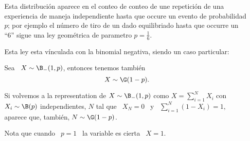 Esta distribuci\'on  aparece en el conteo  de conteo de une  repetici\'on de una
experiencia de maneja  independiente hasta que occure un  evento de probabilidad
$p$; por ejemplo  el n\'umero de tiro de un dado  equilibriado hasta que occurre
un ``6'' sigue una ley geom\'etrica de parametro $p = \frac16$.

Esta ley esta v\'inculada con la binomial negativa, siendo un caso particular:

\begin{lema}\label{Lem:MP:VinculoGeomBinoNegativa}
%
  Sea \ $X \sim \B_-(1,p)$, entonces tenemos tambi\'en
  \[
  X \sim \G(1-p).
  \]
\end{lema}
%
Si volvemos  a la representation  de $X \sim  \B_-(1,p)$ como $X  = \sum_{i=1}^N
X_i$  con $X_i  \sim \B(p)$  independientes,  $N$ tal  que \  $X_N  = 0$  \ y  \
$\sum_{i=1}^N (1-X_i) = 1$, aparece que, tambi\'en, $N \sim \G(1-p)$.

Nota que cuando \  $p =  1$ \ la variable es cierta \  $X = 1$.